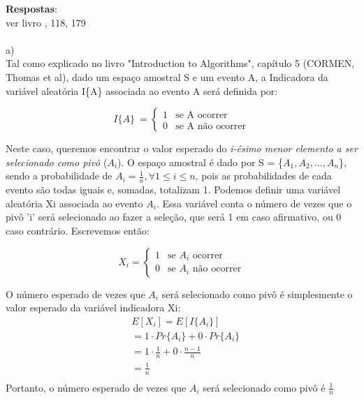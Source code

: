 \documentclass{article}
\begin{document}
\textbf{Respostas}:\\

ver livro , 118, 179\\

\\
a)\\
Tal como explicado no livro "Introduction to Algorithms", capítulo 5 (CORMEN, Thomas et al), dado um espaço amostral S e um evento A, a Indicadora da variável aleatória I\{A\} associada ao evento A será definida por:

\[
 I\{A\}\ =
\left\{
\begin{array}{ll}
1& \textrm{se A ocorrer}\\
0& \textrm{se A não ocorrer}
\end{array}
\right.
\]

Neste caso, queremos encontrar o valor esperado do \textit{i-ésimo menor elemento a ser selecionado como pivô} ($A_{i}$). O espaço amostral é dado por S = \{$A_{1}, A_{2}, ..., A_{n}$\}, sendo a probabilidade de $A_{i} = \frac{1}{n}, \forall 1\leq i \leq  n$, pois as probabilidades de cada evento são todas iguais e, somadas, totalizam 1.
Podemos definir uma variável aleatória Xi associada ao evento $A_{i}$. Essa variável conta o número de vezes que o pivô 'i' será selecionado ao fazer a seleção, que será 1 em caso afirmativo, ou 0 caso contrário. Escrevemos então:

\[
X_{i} =
\left\{
\begin{array}{ll}
1& \textrm{se $A_{i}$ ocorrer}\\
0& \textrm{se $A_{i}$ não ocorrer}
\end{array}
\right.
\]

O número esperado de vezes que $A_{i}$ será selecionado como pivô é simplesmente o valor esperado da variável indicadora Xi:	 \\
\begin{align*}
& E[X_{i}] = E[I\{A_{i}\}] \\
& = 1\cdot Pr\{A_{i}\} + 0\cdot Pr\{A_{i}\}  \\
& = 1\cdot\frac{1}{n} + 0\cdot\frac{n-1}{n} \\
& = \frac{1}{n}\\
\end{align*}
Portanto, o número esperado de vezes que $A_{i}$ será selecionado como pivô é $\frac{1}{n}$ \\
\end{document}

